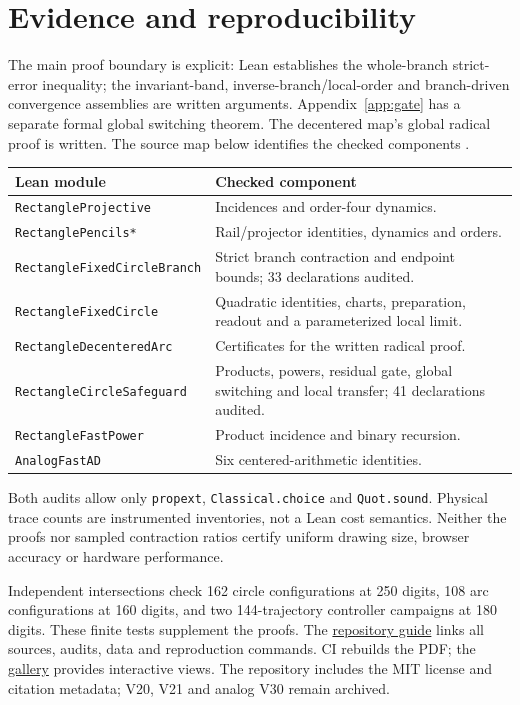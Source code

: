 \documentclass[11pt,a4paper]{article}
\begin{document}
\section{Evidence and reproducibility}\label{sec:scope}
The main proof boundary is explicit: Lean establishes the whole-branch strict-error inequality; the invariant-band, inverse-branch/local-order and branch-driven convergence assemblies are written arguments. Appendix~\ref{app:gate} has a separate formal global switching theorem. The decentered map's global radical proof is written. The source map below identifies the checked components \cite{lean4,mathlib}.
\begin{center}\small
\begin{tabularx}{\linewidth}{@{}p{.34\linewidth}X@{}}\toprule
Lean module & Checked component\\\midrule
\texttt{RectangleProjective} & Incidences and order-four dynamics.\\
\texttt{RectanglePencils*} & Rail/projector identities, dynamics and orders.\\
\texttt{RectangleFixedCircleBranch} & Strict branch contraction and endpoint bounds; 33 declarations audited.\\
\texttt{RectangleFixedCircle} & Quadratic identities, charts, preparation, readout and a parameterized local limit.\\
\texttt{RectangleDecenteredArc} & Certificates for the written radical proof.\\
\texttt{RectangleCircleSafeguard} & Products, powers, residual gate, global switching and local transfer; 41 declarations audited.\\
\texttt{RectangleFastPower} & Product incidence and binary recursion.\\
\texttt{AnalogFastAD} & Six centered-arithmetic identities.\\\bottomrule
\end{tabularx}\end{center}
Both audits allow only \texttt{propext}, \texttt{Classical.choice} and \texttt{Quot.sound}. Physical trace counts are instrumented inventories, not a Lean cost semantics. Neither the proofs nor sampled contraction ratios certify uniform drawing size, browser accuracy or hardware performance.

Independent intersections check 162 circle configurations at 250 digits, 108 arc configurations at 160 digits, and two 144-trajectory controller campaigns at 180 digits. These finite tests supplement the proofs. The \href{https://github.com/ivan-fr/pandrosion/blob/main/paper/reciprocal_geometry_v22/README.md}{repository guide} links all sources, audits, data and reproduction commands. CI rebuilds the PDF; the \href{https://ivan-fr.github.io/pandrosion/}{gallery} provides interactive views. The repository includes the MIT license and citation metadata; V20, V21 and analog V30 remain archived.
\end{document}
